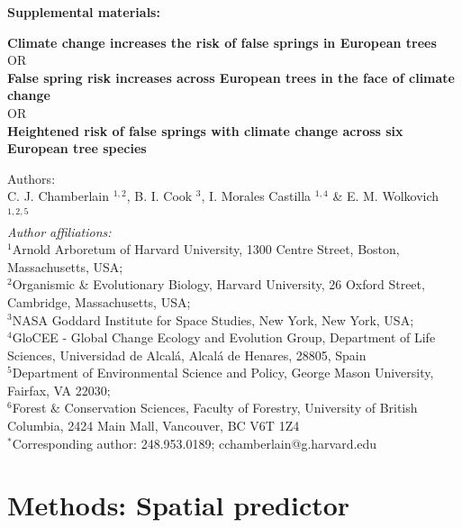 \documentclass{article}\usepackage[]{graphicx}\usepackage[]{color}
\begin{document}
\noindent \textbf{\Large{Supplemental materials:}}\\
{\textbf{\Large{Climate change increases the risk of false springs in European trees}} \\
OR \\
\textbf{\Large{False spring risk increases across European trees in the face of climate change}} \\
OR \\
\textbf{\Large{Heightened risk of false springs with climate change across six European tree species}}


\noindent Authors:\\
C. J. Chamberlain $^{1,2}$, B. I. Cook $^{3}$, I. Morales Castilla $^{1,4}$ \& E. M. Wolkovich $^{1,2,5}$
\vspace{2ex}\\
\emph{Author affiliations:}\\
$^{1}$Arnold Arboretum of Harvard University, 1300 Centre Street, Boston, Massachusetts, USA; \\
$^{2}$Organismic \& Evolutionary Biology, Harvard University, 26 Oxford Street, Cambridge, Massachusetts, USA; \\
$^{3}$NASA Goddard Institute for Space Studies, New York, New York, USA; \\
$^{4}$GloCEE - Global Change Ecology and Evolution Group, Department of Life Sciences, Universidad de Alcal\'{a}, Alcal\'{a} de Henares, 28805, Spain \\
$^{5}$Department of Environmental Science and Policy, George Mason University, Fairfax, VA 22030; \\
$^{6}$Forest \& Conservation Sciences, Faculty of Forestry, University of British Columbia, 2424 Main Mall, Vancouver, BC V6T 1Z4\\
\vspace{2ex}
$^*$Corresponding author: 248.953.0189; cchamberlain@g.harvard.edu\\

\renewcommand{\thetable}{\arabic{table}}
\renewcommand{\thefigure}{\arabic{figure}}
\renewcommand{\labelitemi}{$-$}

\section*{Methods: Spatial predictor} %

}
\end{document}
